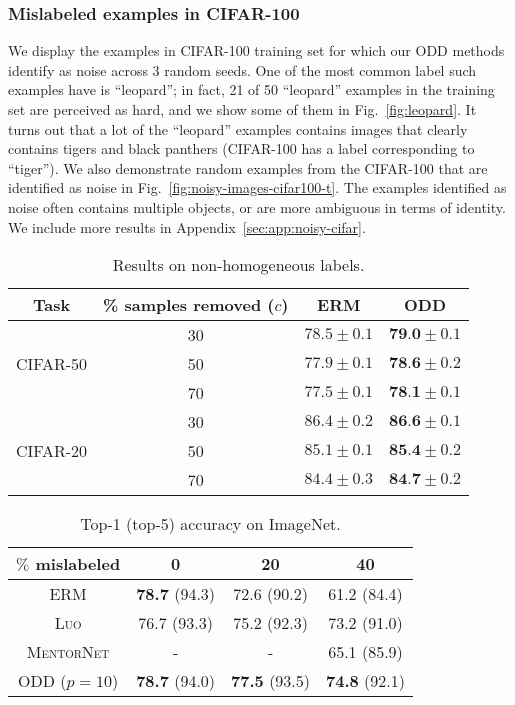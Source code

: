 \documentclass[a4paper,11pt]{article}
\begin{document}
\subsubsection{Mislabeled examples in CIFAR-100} 
We display the examples in CIFAR-100 training set for which our \textsc{ODD} methods identify as noise across 3 random seeds. One of the most common label such examples have is ``leopard''; in fact, 21 of 50 ``leopard'' examples in the training set are perceived as hard, and we show some of them in Fig.~\ref{fig:leopard}. It turns out that a lot of the ``leopard'' examples contains images that clearly contains tigers and black panthers (CIFAR-100 has a label corresponding to ``tiger''). We also demonstrate random examples from the CIFAR-100 that are identified as noise in Fig.~\ref{fig:noisy-images-cifar100-t}. The examples identified as noise often contains multiple objects, or are more ambiguous in terms of identity. We include more results in Appendix~\ref{sec:app:noisy-cifar}.









\setlength{\tabcolsep}{5pt}
\begin{table}
\centering
    \caption{Results on non-homogeneous labels.}
\label{tab:cifar-merge}
\begin{tabular}{c|c|cc}
\toprule
    Task & \% samples removed ($c$) & \textsc{ERM} & \textsc{ODD} \\\midrule
  \multirow{3}{*}{CIFAR-50} 
  & 30 & $78.5 \pm 0.1$ & $\textbf{79.0} \pm 0.1$ \\
  & 50 & $77.9 \pm 0.1$ & $\textbf{78.6} \pm 0.2$ \\
  & 70 & $77.5 \pm 0.1$ &  $\textbf{78.1} \pm 0.1$ \\\midrule
  \multirow{3}{*}{CIFAR-20}  
  & 30 & $86.4 \pm 0.2$ & $\textbf{86.6} \pm 0.1$ \\
  & 50 & $85.1 \pm 0.1$ & $\textbf{85.4} \pm 0.2$ \\
  & 70 & $84.4 \pm 0.3$ & $\textbf{84.7} \pm 0.2$ \\
  \bottomrule
\end{tabular}
\end{table}



\begin{table}
\begin{center}
\caption{Top-1 (top-5) accuracy on ImageNet.}
\label{tab:imagenet-uniform-noise}
\begin{tabular}{c|ccc}
\toprule
$\%$ mislabeled &  0 & 20 & 40 \\\midrule
\textsc{ERM} & \textbf{78.7} (94.3) & 72.6 (90.2) & 61.2 (84.4) \\
\textsc{Luo} & 76.7 (93.3) & 75.2 (92.3) & 73.2 (91.0) \\
\textsc{MentorNet} & -  & -  & 65.1 (85.9) \\\midrule
\textsc{ODD} ($p=10$) & \textbf{78.7} (94.0) & \textbf{77.5} (93.5) & \textbf{74.8} (92.1)
  \\\bottomrule
\end{tabular}
\end{center}
\end{table}
\end{document}
